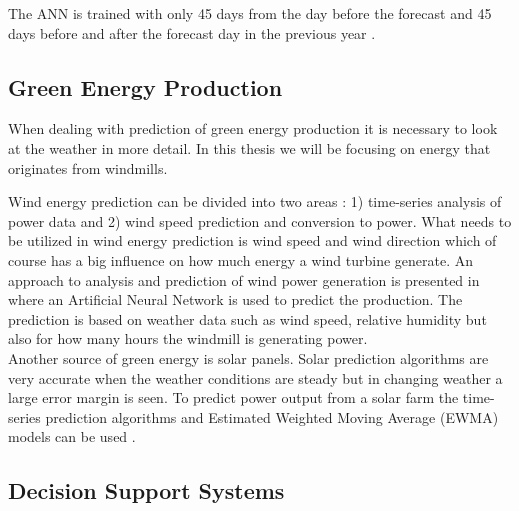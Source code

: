 \documentclass[twoside,11pt,openright]{report}
\begin{document}
The ANN is trained with only 45 days from the day before the forecast and 45 days before and after the forecast day in the previous year \cite{pjmForecast}.
 
\subsection{Green Energy Production}
When dealing with prediction of green energy production it is necessary to look at the weather in more detail. In this thesis we will be focusing on energy that originates from windmills. 

Wind energy prediction can be divided into two areas \cite{5}: 1) time-series analysis of power data and 2) wind speed prediction and conversion to power. What needs to be utilized in wind energy prediction is wind speed and wind direction which of course has a big influence on how much energy a wind turbine generate. An approach to analysis and prediction of wind power generation is presented in \cite{WindPowerGenerationUsingANN} where an Artificial Neural Network is used to predict the production. The prediction is based on weather data such as wind speed, relative humidity but also for how many hours the windmill is generating power. 
\\[0.5cm]
Another source of green energy is solar panels. Solar
prediction algorithms are very accurate when the weather conditions are steady but in changing weather a large error margin is seen. To predict power output from a solar farm the time-series prediction algorithms and Estimated Weighted Moving Average (EWMA) models can be used \cite{5}.

\subsection{Decision Support Systems}
\end{document}
